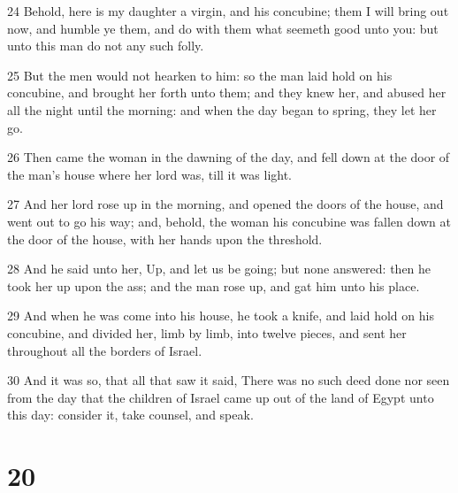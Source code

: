 \par 24 Behold, here is my daughter a virgin, and his concubine; them I will bring out now, and humble ye them, and do with them what seemeth good unto you: but unto this man do not any such folly.
\par 25 But the men would not hearken to him: so the man laid hold on his concubine, and brought her forth unto them; and they knew her, and abused her all the night until the morning: and when the day began to spring, they let her go.
\par 26 Then came the woman in the dawning of the day, and fell down at the door of the man's house where her lord was, till it was light.
\par 27 And her lord rose up in the morning, and opened the doors of the house, and went out to go his way; and, behold, the woman his concubine was fallen down at the door of the house, with her hands upon the threshold.
\par 28 And he said unto her, Up, and let us be going; but none answered: then he took her up upon the ass; and the man rose up, and gat him unto his place.
\par 29 And when he was come into his house, he took a knife, and laid hold on his concubine, and divided her, limb by limb, into twelve pieces, and sent her throughout all the borders of Israel.
\par 30 And it was so, that all that saw it said, There was no such deed done nor seen from the day that the children of Israel came up out of the land of Egypt unto this day: consider it, take counsel, and speak.

\chapter{20}

